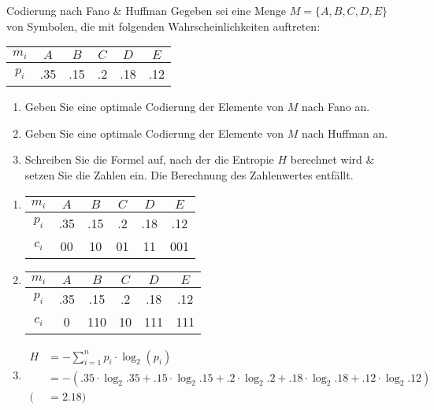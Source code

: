 \documentclass{article}
\begin{document}
\begin{exercise}{Codierung nach Fano \& Huffman}
  Gegeben sei eine Menge $M = \{A, B, C, D, E\}$ von Symbolen, die mit folgenden Wahrscheinlichkeiten auftreten:
  \begin{tabular}{c|ccccc}
    $m_i$ & $A$ & $B$ & $C$ & $D$ & $E$ \\
    \hline
    $p_i$ & .35 & .15 & .2  & .18 & .12 \\
  \end{tabular}
  \begin{enumerate}
    \item Geben Sie eine optimale Codierung der Elemente von $M$ nach Fano an.
    \item Geben Sie eine optimale Codierung der Elemente von $M$ nach Huffman an.
    \item Schreiben Sie die Formel auf, nach der die Entropie $H$ berechnet wird \& setzen Sie die Zahlen ein. Die Berechnung des Zahlenwertes entfällt.
  \end{enumerate}

  \begin{solution}
    \begin{enumerate}
      \item
            \begin{tabular}{c|ccccc}
              $m_i$ & $A$ & $B$ & $C$ & $D$ & $E$ \\
              \hline
              $p_i$ & .35 & .15 & .2  & .18 & .12 \\
              $c_i$ & 00  & 10  & 01  & 11  & 001 \\
            \end{tabular}
      \item
            \begin{tabular}{c|ccccc}
              $m_i$ & $A$ & $B$ & $C$ & $D$ & $E$ \\
              \hline
              $p_i$ & .35 & .15 & .2  & .18 & .12 \\
              $c_i$ & 0   & 110 & 10  & 111 & 111 \\
            \end{tabular}
      \item
            \begin{equation*}
              \begin{split}
                H & = -\sum_{i=1}^{n} p_i \cdot \log_2(p_i)                                                                         \\
                  & = -(.35\cdot \log_2{.35}+ .15\cdot \log_2{.15}+ .2\cdot \log_2{.2}+ .18\cdot \log_2{.18}+ .12\cdot \log_2{.12}) \\
                ( & =2.18)
              \end{split}
            \end{equation*}
    \end{enumerate}
  \end{solution}
\end{exercise}
\end{document}
